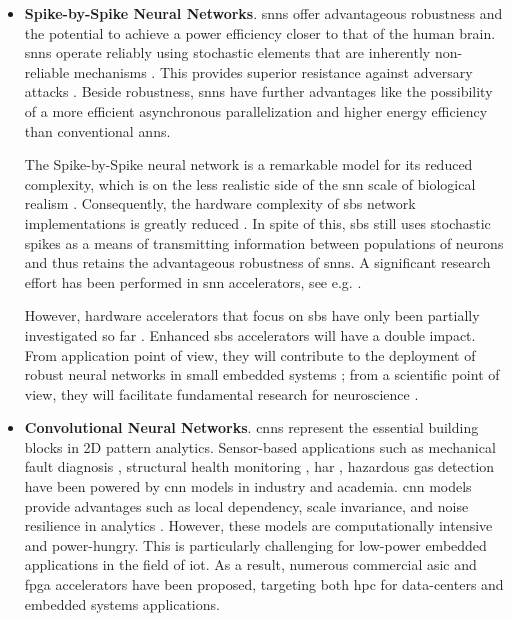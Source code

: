 \begin{itemize}

\item \textbf{Spike-by-Spike Neural Networks}. \glspl{snn} offer advantageous robustness and the potential to achieve a power efficiency closer to that of the human brain. \glspl{snn} operate reliably using stochastic elements that are inherently non-reliable mechanisms \cite{mcdonnell2011benefits}. This provides superior resistance against adversary attacks
\cite{ernst2007efficient, Dapello2020.06.16.154542}. Beside robustness, \glspl{snn} have further advantages like the possibility of a more efficient asynchronous parallelization and higher energy efficiency than conventional \glspl{ann}.

The Spike-by-Spike neural network is a remarkable model for its reduced complexity, which is on the less realistic side of the \gls{snn} scale of biological realism \cite{rotermund2019Backpropagation,ernst2007efficient}. Consequently, the hardware complexity of \gls{sbs} network implementations is greatly reduced \cite{rotermund2018massively}. In spite of this, \gls{sbs} still uses stochastic spikes as a means of transmitting information between populations of neurons and thus retains the advantageous robustness of \glspl{snn}. A significant research effort has been performed in \gls{snn} accelerators, see e.g. \cite{roy2019towards,bouvier2019spiking,
	young2019review,TrueNorth_Trans15,Spinnaker_Trans13,davies2018loihi}.

However, hardware accelerators that focus on \gls{sbs} have only been partially investigated so far \cite{rotermund2018massively}. Enhanced \gls{sbs} accelerators will have a double impact. From application point of view, they will contribute to the deployment of robust neural networks in small embedded systems \cite{nevarez2020accelerator}; from a scientific point of view, they will facilitate fundamental research for neuroscience \cite{ernst2007efficient,rotermund2019recurrentsbs, dayan2001theoretical}.

\item \textbf{Convolutional Neural Networks}. \glspl{cnn} represent the essential building blocks in 2D pattern analytics. Sensor-based applications such as mechanical fault diagnosis \cite{li2019sensor,dong2018rolling}, structural health monitoring \cite{nagayama2007structural}, \gls{har} \cite{wang2019deep}, hazardous gas detection \cite{kim2017hazardous} have been powered by \gls{cnn} models in industry and academia. \gls{cnn} models provide advantages such as local dependency, scale invariance, and noise resilience in analytics \cite{du2014leveraging}. However, these models are computationally intensive and power-hungry. This is particularly challenging for low-power embedded applications in the field of \gls{iot}. As a result, numerous commercial \gls{asic} and \gls{fpga} accelerators have been proposed, targeting both \gls{hpc} for data-centers and embedded systems applications.


\end{itemize}
